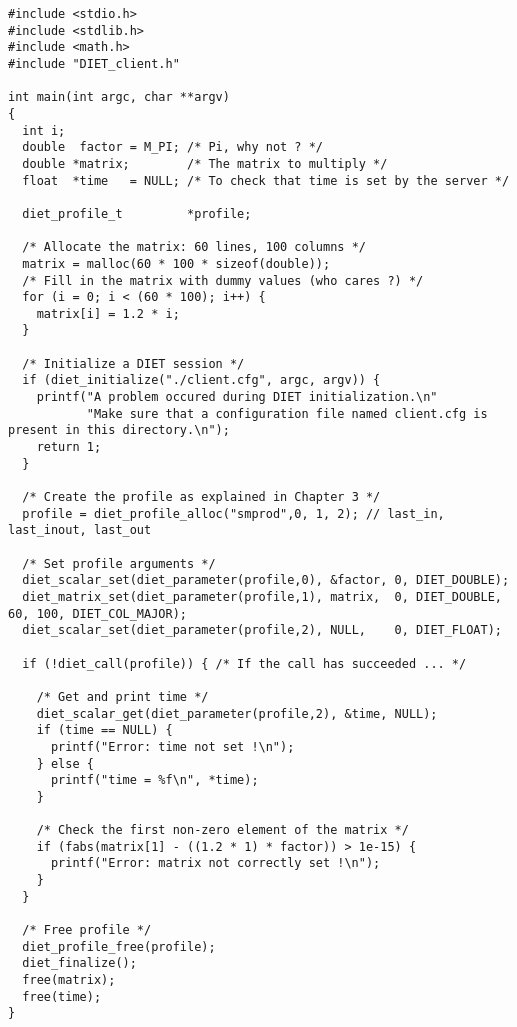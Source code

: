 {\footnotesize
\begin{verbatim}
#include <stdio.h>
#include <stdlib.h>
#include <math.h>
#include "DIET_client.h"

int main(int argc, char **argv)
{
  int i;
  double  factor = M_PI; /* Pi, why not ? */
  double *matrix;        /* The matrix to multiply */
  float  *time   = NULL; /* To check that time is set by the server */

  diet_profile_t         *profile;

  /* Allocate the matrix: 60 lines, 100 columns */
  matrix = malloc(60 * 100 * sizeof(double));
  /* Fill in the matrix with dummy values (who cares ?) */
  for (i = 0; i < (60 * 100); i++) {
    matrix[i] = 1.2 * i;
  }
  
  /* Initialize a DIET session */
  if (diet_initialize("./client.cfg", argc, argv)) {
    printf("A problem occured during DIET initialization.\n"
           "Make sure that a configuration file named client.cfg is present in this directory.\n");
    return 1;
  }

  /* Create the profile as explained in Chapter 3 */
  profile = diet_profile_alloc("smprod",0, 1, 2); // last_in, last_inout, last_out
  
  /* Set profile arguments */
  diet_scalar_set(diet_parameter(profile,0), &factor, 0, DIET_DOUBLE);
  diet_matrix_set(diet_parameter(profile,1), matrix,  0, DIET_DOUBLE, 60, 100, DIET_COL_MAJOR);
  diet_scalar_set(diet_parameter(profile,2), NULL,    0, DIET_FLOAT);
  
  if (!diet_call(profile)) { /* If the call has succeeded ... */
     
    /* Get and print time */
    diet_scalar_get(diet_parameter(profile,2), &time, NULL);
    if (time == NULL) {
      printf("Error: time not set !\n");
    } else {
      printf("time = %f\n", *time);
    }

    /* Check the first non-zero element of the matrix */
    if (fabs(matrix[1] - ((1.2 * 1) * factor)) > 1e-15) {
      printf("Error: matrix not correctly set !\n");
    }
  }

  /* Free profile */
  diet_profile_free(profile);
  diet_finalize();
  free(matrix);
  free(time);
}
\end{verbatim}
}


